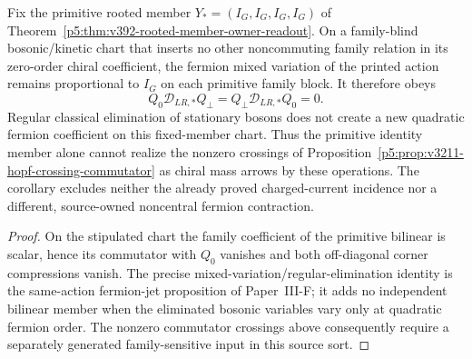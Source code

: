 \documentclass[12pt,a4paper]{article}
\begin{document}
\begin{corollary}
\label{p5:cor:v3211-primitive-mixed-jet-centrality}
Fix the primitive rooted member \(Y_*=(I_G,I_G,I_G,I_G)\) of
Theorem~\ref{p5:thm:v392-rooted-member-owner-readout}.  On a
family-blind bosonic/kinetic chart that inserts no other noncommuting
family relation in its zero-order chiral coefficient, the fermion mixed
variation of the printed action remains proportional to \(I_G\) on each
primitive family block.  It therefore obeys
\[
 \boxed{Q_0\mathscr D_{LR,*}Q_\perp
       =Q_\perp\mathscr D_{LR,*}Q_0=0.}
\]
Regular classical elimination of stationary bosons does not create a new
quadratic fermion coefficient on this fixed-member chart.  Thus the
primitive identity member alone cannot realize the nonzero crossings of
Proposition~\ref{p5:prop:v3211-hopf-crossing-commutator} as chiral mass
arrows by these operations.  The corollary excludes neither the already
proved charged-current incidence nor a different, source-owned noncentral
fermion contraction.
\end{corollary}
\begin{proof}
On the stipulated chart the family coefficient of the primitive bilinear
is scalar, hence its commutator with \(Q_0\) vanishes and both off-diagonal
corner compressions vanish.  The precise mixed-variation/regular-elimination
identity is the same-action fermion-jet proposition of Paper~III-F;
it adds no independent bilinear member when the eliminated bosonic variables
vary only at quadratic fermion order.  The nonzero commutator crossings
above consequently require a separately generated family-sensitive input
in this source sort.
\end{proof}
\end{document}
